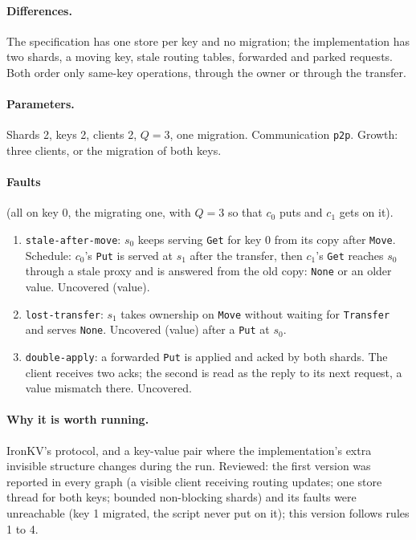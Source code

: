 \documentclass[11pt,a4paper]{article}
\newcommand{\code}[1]{\texttt{#1}}
\begin{document}
\paragraph{Differences.} The specification has one store per key and no migration; the
implementation has two shards, a moving key, stale routing tables, forwarded and parked
requests. Both order only same-key operations, through the owner or through the transfer.

\paragraph{Parameters.} Shards 2, keys 2, clients 2, $Q = 3$, one migration. Communication
\code{p2p}. Growth: three clients, or the migration of both keys.

\paragraph{Faults} (all on key 0, the migrating one, with $Q = 3$ so that $c_0$ puts and $c_1$
gets on it).
\begin{enumerate}
  \item \code{stale-after-move}: $s_0$ keeps serving \code{Get} for key 0 from its copy after
        \code{Move}. Schedule: $c_0$'s \code{Put} is served at $s_1$ after the transfer, then
        $c_1$'s \code{Get} reaches $s_0$ through a stale proxy and is answered from the old copy:
        \code{None} or an older value. Uncovered (value).
  \item \code{lost-transfer}: $s_1$ takes ownership on \code{Move} without waiting for
        \code{Transfer} and serves \code{None}. Uncovered (value) after a \code{Put} at $s_0$.
  \item \code{double-apply}: a forwarded \code{Put} is applied and acked by both shards. The
        client receives two acks; the second is read as the reply to its next request, a value
        mismatch there. Uncovered.
\end{enumerate}

\paragraph{Why it is worth running.} IronKV's protocol, and a key-value pair where the
implementation's extra invisible structure changes during the run. Reviewed: the first
version was reported in every graph (a visible client receiving routing updates; one store
thread for both keys; bounded non-blocking shards) and its faults were unreachable (key 1
migrated, the script never put on it); this version follows rules 1 to 4.
\end{document}
